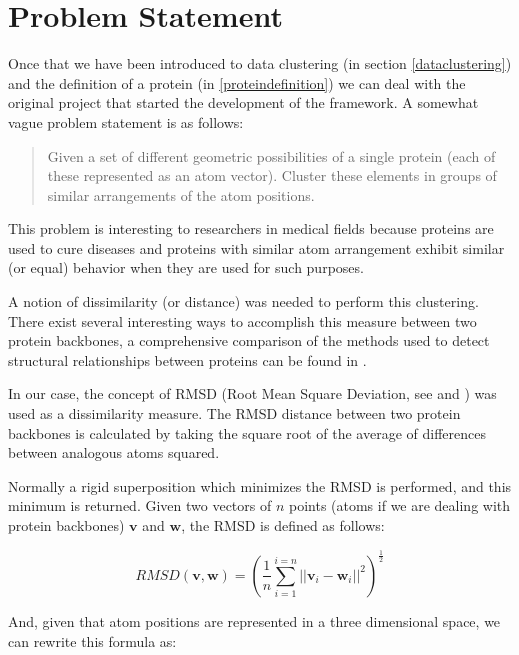 \documentclass[a4paper,12pt,english]{report}
\begin{document}
\chapter{Problem Statement}\label{clusterer-problem}

Once that we have been introduced to data clustering (in section \ref{dataclustering}) and the definition of a protein (in \ref{proteindefinition}) we can deal with the original project that started the development of the framework. A somewhat vague problem statement is as follows:

\begin{quote}
Given a set of different geometric possibilities of a single protein (each of these represented as an atom vector). Cluster these elements in groups of similar arrangements of the atom positions.
\end{quote}

This problem is interesting to researchers in medical fields because proteins are used to cure diseases and proteins with similar atom arrangement exhibit similar (or equal) behavior when they are used for such purposes.

A notion of dissimilarity (or distance) was needed to perform this clustering. There exist several interesting ways to accomplish this measure between two protein backbones, a comprehensive comparison of the methods used to detect structural relationships between proteins can be found in \cite{koehl}.

In our case, the concept of RMSD (Root Mean Square Deviation, see \cite{proteins} and \cite{clustering}) was used as a dissimilarity measure. The RMSD distance between two protein backbones is calculated by taking the square root of the average of differences between analogous atoms squared.

Normally a rigid superposition which minimizes the RMSD is performed, and this minimum is returned. Given two vectors of $n$ points (atoms if we are dealing with protein backbones) $\mathbf{v}$ and $\mathbf{w}$, the RMSD is defined as follows:

$$RMSD(\mathbf{v},\mathbf{w}) = \left(\frac{1}{n}\sum_{i=1}^{i=n} ||\mathbf{v}_i - \mathbf{w}_i||^{2}\right)^{\frac{1}{2}}$$


And, given that atom positions are represented in a three dimensional space, we can rewrite this formula as:
\end{document}
